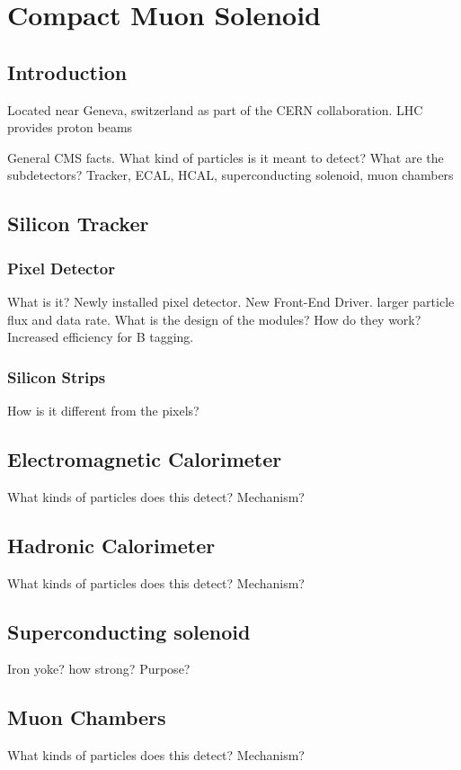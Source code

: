 \chapter{Compact Muon Solenoid}
\label{ch:CMS}

\section{Introduction}
\label{sec:cmsIntro}

Located near Geneva, switzerland as part of the CERN collaboration. LHC provides proton beams

General CMS facts. What kind of particles is it meant to detect? What are the subdetectors? Tracker, ECAL, HCAL, superconducting solenoid, muon chambers

\section{Silicon Tracker}
\label{sec:Tracker}

\subsection{Pixel Detector}
\label{subsec:Pixel}

What is it?
Newly installed pixel detector. New Front-End Driver.
larger particle flux and data rate. What is the design of the modules? How do they work?
Increased efficiency for B tagging.

\subsection{Silicon Strips}
\label{subsec:Strips}

How is it different from the pixels?

\section{Electromagnetic Calorimeter}
\label{sec:ECAL}

What kinds of particles does this detect? Mechanism?

\section{Hadronic Calorimeter}
\label{sec:HCAL}

What kinds of particles does this detect? Mechanism?

\section{Superconducting solenoid}
\label{sec:Solenoid}

Iron yoke? how strong? Purpose?

\section{Muon Chambers}
\label{sec:muCham}

What kinds of particles does this detect? Mechanism?